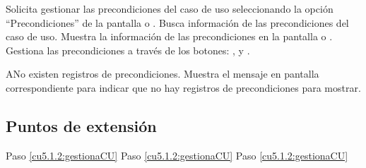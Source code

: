  \begin{UCtrayectoria}
    \UCpaso[\UCactor] Solicita gestionar las precondiciones del caso de uso seleccionando la opción ``Precondiciones'' de la pantalla  o .
    \UCpaso[\UCsist] Busca información de las precondiciones del caso de uso. 
    \UCpaso[\UCsist] Muestra la información de las precondiciones en la pantalla  o . 
    \UCpaso[\UCactor] Gestiona las precondiciones a través de los botones: \btnAgregar, \btnEditar y \btnEliminar. \label{cu5.1.2:gestionaCU}
 \end{UCtrayectoria}
 
 \begin{UCtrayectoriaA}{A}{No existen registros de precondiciones.}
    \UCpaso[\UCsist] Muestra el mensaje  en pantalla correspondiente
    para indicar que no hay registros de precondiciones para mostrar.
 \end{UCtrayectoriaA}
 

\subsection{Puntos de extensión}

	{Paso \ref{cu5.1.2:gestionaCU}}
	{}
	{Paso \ref{cu5.1.2:gestionaCU}}
	{}
	{Paso \ref{cu5.1.2:gestionaCU}}
	{}
  